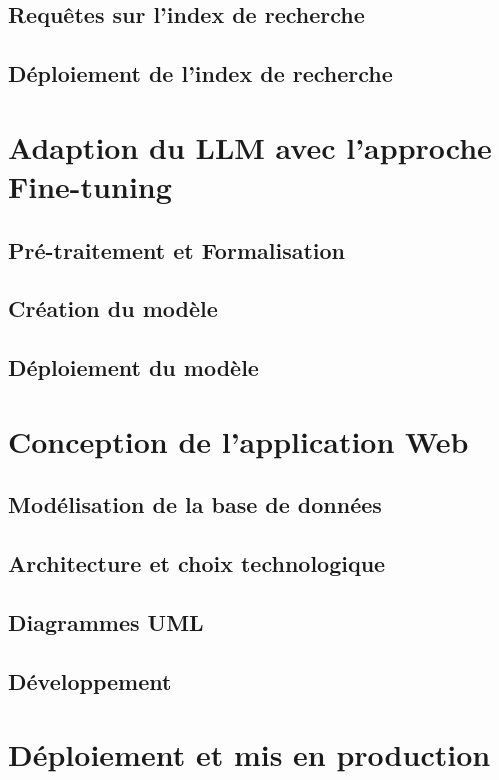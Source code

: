 \subsection{Requêtes sur l'index de recherche}
\subsection{Déploiement de l'index de recherche}

\section{Adaption du LLM avec l'approche Fine-tuning}
\subsection{Pré-traitement et Formalisation}
\subsection{Création du modèle}
\subsection{Déploiement du modèle}

\section{Conception de l'application Web}
\subsection{Modélisation de la base de données}
\subsection{Architecture et choix technologique}
\subsection{Diagrammes UML}
\subsection{Développement}

\section{Déploiement et mis en production}
